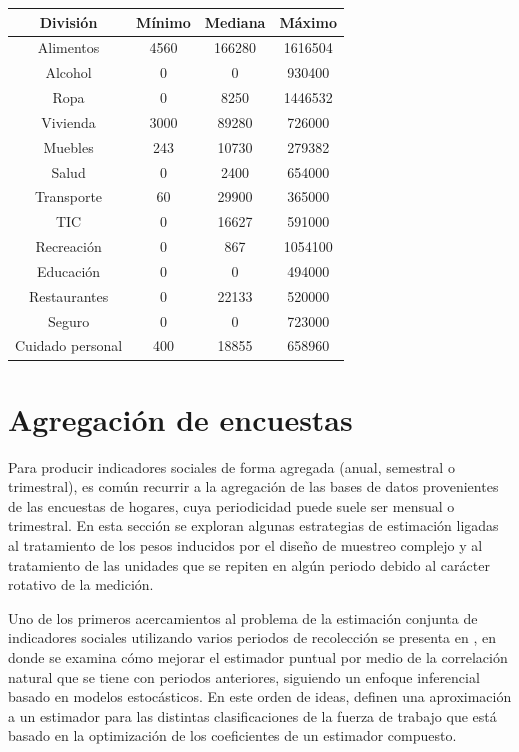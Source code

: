 \documentclass[
  12pt,
  spanish,
]{book}
\begin{document}
\begin{longtable}[]{@{}cccc@{}}
\toprule
División & Mínimo & Mediana & Máximo \\
\midrule
\endhead
Alimentos & 4560 & 166280 & 1616504 \\
Alcohol & 0 & 0 & 930400 \\
Ropa & 0 & 8250 & 1446532 \\
Vivienda & 3000 & 89280 & 726000 \\
Muebles & 243 & 10730 & 279382 \\
Salud & 0 & 2400 & 654000 \\
Transporte & 60 & 29900 & 365000 \\
TIC & 0 & 16627 & 591000 \\
Recreación & 0 & 867 & 1054100 \\
Educación & 0 & 0 & 494000 \\
Restaurantes & 0 & 22133 & 520000 \\
Seguro & 0 & 0 & 723000 \\
Cuidado personal & 400 & 18855 & 658960 \\
\bottomrule
\end{longtable}

\hypertarget{agregaciuxf3n-de-encuestas}{%
\chapter{Agregación de encuestas}\label{agregaciuxf3n-de-encuestas}}

Para producir indicadores sociales de forma agregada (anual, semestral o
trimestral), es común recurrir a la agregación de las bases de datos
provenientes de las encuestas de hogares, cuya periodicidad puede suele
ser mensual o trimestral. En esta sección se exploran algunas
estrategias de estimación ligadas al tratamiento de los pesos inducidos
por el diseño de muestreo complejo y al tratamiento de las unidades que
se repiten en algún periodo debido al carácter rotativo de la medición.

Uno de los primeros acercamientos al problema de la estimación conjunta
de indicadores sociales utilizando varios periodos de recolección se
presenta en \citet{Gurney_Daly_1965}, en donde se examina cómo mejorar el
estimador puntual por medio de la correlación natural que se tiene con
periodos anteriores, siguiendo un enfoque inferencial basado en modelos
estocásticos. En este orden de ideas, \citet{Lent_Miller_Duff_1999} definen una
aproximación a un estimador para las distintas clasificaciones de la
fuerza de trabajo que está basado en la optimización de los coeficientes
de un estimador compuesto.
\end{document}
